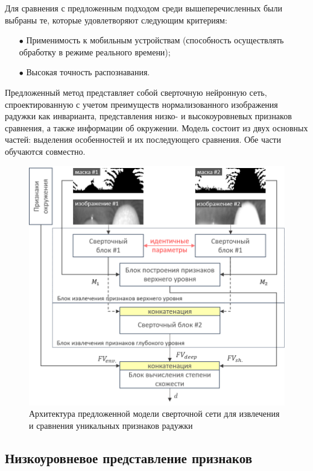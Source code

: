 Для сравнения с предложенным подходом среди вышеперечисленных были выбраны те, которые удовлетворяют следующим критериям:

\begin{enumerate}
	\item[$\bullet$] Применимость к мобильным устройствам (способность осуществлять обработку в режиме реального времени);
	\item[$\bullet$] Высокая точность распознавания.
\end{enumerate}

Предложенный метод представляет собой сверточную нейронную сеть, спроектированную с учетом преимуществ нормализованного изображения радужки как инварианта, представления низко- и высокоуровневых признаков сравнения, а также информации об окружении. Модель состоит из двух основных частей: выделения особенностей и их последующего сравнения. Обе части обучаются совместно.

\begin{figure}[t!]
	\begin{center}
		\includegraphics[width=.75\linewidth]{pictures/block-scheme-matcher.png}
	\end{center}
	\caption{Архитектура предложенной модели сверточной сети для извлечения и сравнения уникальных признаков радужки}
	\label{fig:block-scheme-matcher}
\end{figure}

\subsection{Низкоуровневое представление признаков}
\label{sec:fem-nn-shfv}

